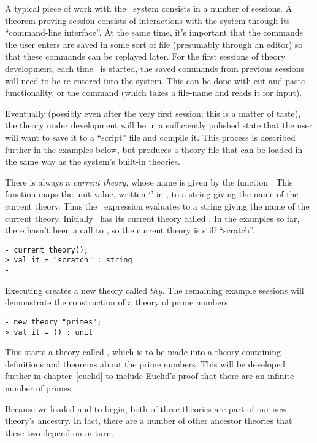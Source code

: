 A typical piece of work with the \HOL\ system consists in a number of
sessions.  A theorem-proving session consists of interactions with the
system through its ``command-line interface''.  At the same time, it's
important that the commands the user enters are saved in some sort of
file (presumably through an editor) so that these commands can be
replayed later.  For the first sessions of theory development, each
time \HOL\ is started, the saved commands from previous sessions will
need to be re-entered into the system.  This can be done with
cut-and-paste functionality, or the  command (which takes a
file-name and reads it for input).

Eventually (possibly even after the very first session; this is a
matter of taste), the theory under development will be in a
sufficiently polished state that the user will want to save it to a
``script'' file and compile it.  This process is described further in
the examples below, but produces a theory file that can be loaded in
the same way as the system's built-in theories.

There is always a {\it current theory\/}, whose name is given by the
function .  This function maps the unit value,
written `\ml{()}' in \ML, to a string giving the name of the current
theory.  Thus the \ML\ expression  evaluates to
a string giving the name of the current theory.  Initially \HOL\ has
its current theory called .  In the examples so far, there
hasn't been a call to , so the current theory is still
``scratch''.

\begin{session}\begin{verbatim}
- current_theory();
> val it = "scratch" : string
-
\end{verbatim}\end{session}

    Executing  creates a new theory called
    $thy$.  The remaining example sessions will demonstrate the
    construction of a theory of prime numbers.

\begin{session}\begin{verbatim}
- new_theory "primes";
> val it = () : unit
\end{verbatim}\end{session}

\noindent
This starts a theory called , which is to be made into a
theory containing definitions and theorems about the prime numbers.
This will be developed further in chapter~\ref{euclid} to include
Euclid's proof that there are an infinite number of primes.

Because we loaded  and  to begin,
both of these theories are part of our new theory's ancestry.  In
fact, there are a number of other ancestor theories that these two
depend on in turn.

